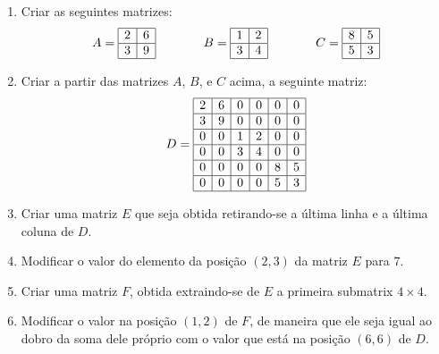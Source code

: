 \documentclass[11pt,fleqn]{practice}
\begin{document}
\begin{enumerate}

\item Criar as seguintes matrizes:
\[ \begin{array}{lll}
A = \begin{array}{|r|r|} \hline 2 & 6 \\ \hline  3 & 9 \\ \hline  \end{array} & \hspace*{1cm}
B = \begin{array}{|r|r|} \hline 1 & 2 \\ \hline 3 &  4 \\ \hline  \end{array}  & \hspace*{1cm}
C = \begin{array}{|r|r|} \hline 8 & 5 \\ \hline 5 & 3 \\ \hline \end{array} 
\end{array}
\]

\item Criar a partir das matrizes $A$, $B$, e $C$ acima, a seguinte matriz:
\[ \begin{array}{l}
D = \begin{array}{|r|r|r|r|r|r|} \hline 
        2 & 6 & 0 & 0 & 0 & 0 \\ \hline 
        3 & 9 & 0 & 0 & 0 & 0 \\ \hline  
        0 & 0 & 1 & 2 & 0 & 0 \\ \hline  
        0 & 0 & 3 & 4 & 0 & 0 \\ \hline  
        0 & 0 & 0 & 0 & 8 & 5 \\ \hline  
        0 & 0 & 0 & 0 & 5 & 3 \\ \hline  
\end{array} 
\end{array}
\]

\item Criar uma matriz $E$ que seja obtida retirando-se a última linha e a última coluna de $D$.
\item Modificar o valor do elemento da posição $(2,3)$ da matriz $E$ para $7$.
\item Criar uma matriz $F$, obtida extraindo-se de $E$ a primeira submatrix $4 \times 4$.
\item Modificar o valor na posição $(1,2)$ de $F$, de maneira que ele seja igual ao dobro da soma dele próprio com o valor que está na posição $(6,6)$ de $D$.

\end{enumerate}
\end{document}
